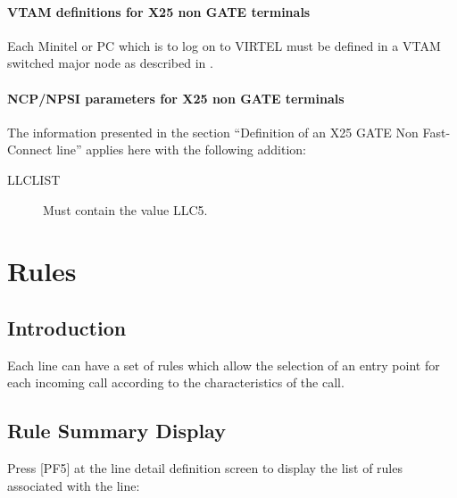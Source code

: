 \documentclass[letterpaper,10pt,english]{sphinxmanual}
\begin{document}
\subsubsection{VTAM definitions for X25 non GATE terminals}
\label{\detokenize{connectivity_guide:vtam-definitions-for-x25-non-gate-terminals}}
Each Minitel or PC which is to log on to VIRTEL must be defined in a VTAM switched major node as described in {\hyperref[\detokenize{connectivity_guide:bookmark94}]{}}.


\subsubsection{NCP/NPSI parameters for X25 non GATE terminals}
\label{\detokenize{connectivity_guide:ncp-npsi-parameters-for-x25-non-gate-terminals}}
The information presented in the section “Definition of an X25 GATE Non Fast-Connect line” applies here with the following addition:

\begin{description}
\item[{LLCLIST}] \leavevmode
Must contain the value LLC5.

\end{description}


\chapter{Rules}
\label{\detokenize{connectivity_guide:rules}}

\section{Introduction}
\label{\detokenize{connectivity_guide:id3}}
Each line can have a set of rules which allow the selection of an entry point for each incoming call according to the characteristics of the call.


\section{Rule Summary Display}
\label{\detokenize{connectivity_guide:rule-summary-display}}
Press {[}PF5{]} at the line detail definition screen to display the list of rules associated with the line:


\end{document}
